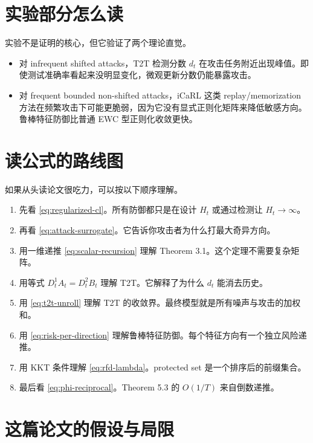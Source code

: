 \documentclass[UTF8,fontset=none,11pt]{ctexart}
\theoremstyle{cnstyle}
\begin{document}
\section{实验部分怎么读}

实验不是证明的核心，但它验证了两个理论直觉。

\begin{itemize}
  \item 对 infrequent shifted attacks，T2T 检测分数 \(d_t\) 在攻击任务附近出现峰值。即使测试准确率看起来没明显变化，微观更新分数仍能暴露攻击。
  \item 对 frequent bounded non-shifted attacks，iCaRL 这类 replay/memorization 方法在频繁攻击下可能更脆弱，因为它没有显式正则化矩阵来降低敏感方向。鲁棒特征防御比普通 EWC 型正则化收敛更快。
\end{itemize}

\section{读公式的路线图}

如果从头读论文很吃力，可以按以下顺序理解。

\begin{enumerate}
  \item 先看 \eqref{eq:regularized-cl}。所有防御都只是在设计 \(H_t\) 或通过检测让 \(H_t\to\infty\)。
  \item 再看 \eqref{eq:attack-surrogate}。它告诉你攻击者为什么打最大奇异方向。
  \item 用一维递推 \eqref{eq:scalar-recursion} 理解 Theorem 3.1。这个定理不需要复杂矩阵。
  \item 用等式 \(D_t^1A_t=D_t^2B_t\) 理解 T2T。它解释了为什么 \(d_t\) 能消去历史。
  \item 用 \eqref{eq:t2t-unroll} 理解 T2T 的收敛界。最终模型就是所有噪声与攻击的加权和。
  \item 用 \eqref{eq:risk-per-direction} 理解鲁棒特征防御。每个特征方向有一个独立风险递推。
  \item 用 KKT 条件理解 \eqref{eq:rfd-lambda}。protected set 是一个排序后的前缀集合。
  \item 最后看 \eqref{eq:phi-reciprocal}。Theorem 5.3 的 \(O(1/T)\) 来自倒数递推。
\end{enumerate}

\section{这篇论文的假设与局限}
\end{document}
